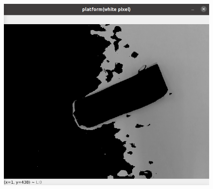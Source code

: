 \documentclass[fontset=fandol,type=bachelor,campus=harbin]{hithesisbook}
\begin{document}
\begin{figure}[h]
{\begin{minipage}[h]{0.45\textwidth}
   		 	\includegraphics[width=1\textwidth]{chapter4/图像处理抑制边缘干扰b}
    		\end{minipage}
		\label{图像处理抑制边缘干扰b}
    	}
	\\ 
\end{figure}
\end{document}
